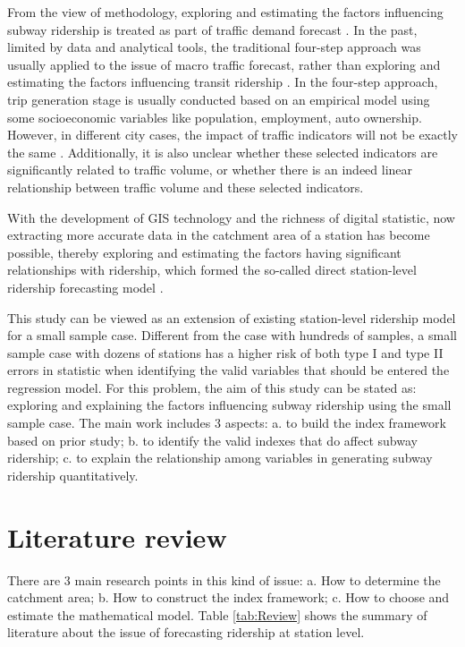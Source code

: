 \documentclass[utf8]{article}
\begin{document}
%
From the view of methodology, exploring and estimating the factors influencing subway ridership is treated as part of traffic demand forecast \cite{Miller1999,Boyce1994}. In the past, limited by data and analytical tools, the traditional four-step approach was usually applied to the issue of macro traffic forecast, rather than exploring and estimating the factors influencing transit ridership \cite{Cervero2006,Chu2004,Duduta2013}. In the four-step approach, trip generation stage is usually conducted based on an empirical model using some socioeconomic variables like population, employment, auto ownership. However, in different city cases, the impact of traffic indicators will not be exactly the same \cite{Jones1983}. Additionally, it is also unclear whether these selected indicators are significantly related to traffic volume, or whether there is an indeed linear relationship between traffic volume and these selected indicators.

%
With the development of GIS technology and the richness of digital statistic, now extracting more accurate data in the catchment area of a station has become possible, thereby exploring and estimating the factors having significant relationships with ridership, which formed the so-called direct station-level ridership forecasting model \cite{Walters2003}.

%
This study can be viewed as an extension of existing station-level ridership model for a small sample case. Different from the case with hundreds of samples, a small sample case with dozens of stations has a higher risk of both type I and type II errors in statistic when identifying the valid variables that should be entered the regression model. For this problem, the aim of this study can be stated as: exploring and explaining the factors influencing subway ridership using the small sample case. The main work includes 3 aspects: a. to build the index framework based on prior study; b. to identify the valid indexes that do affect subway ridership; c. to explain the relationship among variables in generating subway ridership quantitatively.

%
\section{Literature review}
\indent

There are 3 main research points in this kind of issue: a. How to determine the catchment area; b. How to construct the index framework; c. How to choose and estimate the mathematical model. Table \ref{tab:Review} shows the summary of literature about the issue of forecasting ridership at station level.
\end{document}
